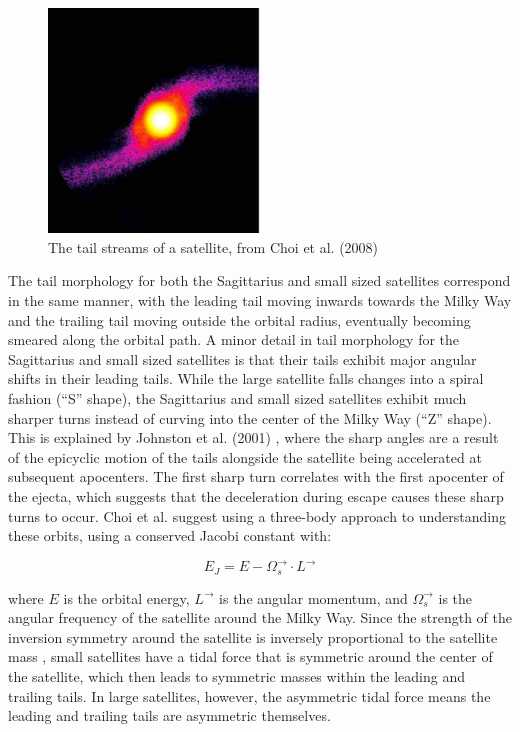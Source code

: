 \documentclass{article}
\begin{document}
\begin{figure}
	\centering
	\includegraphics[width=0.5\textwidth]{tailStreams}	
	\caption{The tail streams of a satellite, from Choi et al. (2008)}
\end{figure}

The tail morphology for both the Sagittarius and small sized satellites correspond in the same manner, with the leading tail moving inwards towards the Milky Way and the trailing tail moving outside the orbital radius, eventually becoming smeared along the orbital path. A minor detail in tail morphology for the Sagittarius and small sized satellites is that their tails exhibit major angular shifts in their leading tails. While the large satellite falls changes into a spiral fashion (``S'' shape), the Sagittarius and small sized satellites exhibit much sharper turns instead of curving into the center of the Milky Way (``Z'' shape). This is explained by Johnston et al. (2001) \cite{debrisSatellite}, where the sharp angles are a result of the epicyclic motion of the tails alongside the satellite being accelerated at subsequent apocenters. The first sharp turn correlates with the first apocenter of the ejecta, which suggests that the deceleration during escape causes these sharp turns to occur. Choi et al. \cite{binneyTremaine} suggest using a three-body approach to understanding these orbits, using a conserved Jacobi constant with:

\[
E_J = E - \Omega^{\rightarrow}_{s}\cdot L^{\rightarrow} 
\]

where $E$ is the orbital energy, $L^{\rightarrow}$ is the angular momentum, and $\Omega^{\rightarrow}_s$ is the angular frequency of the satellite around the Milky Way. Since the strength of the inversion symmetry around the satellite is inversely proportional to the satellite mass \cite{dymanicsOfTidalTails}, small satellites have a tidal force that is symmetric around the center of the satellite, which then leads to symmetric masses within the leading and trailing tails. In large satellites, however, the asymmetric tidal force means the leading and trailing tails are asymmetric themselves. 
\end{document}
